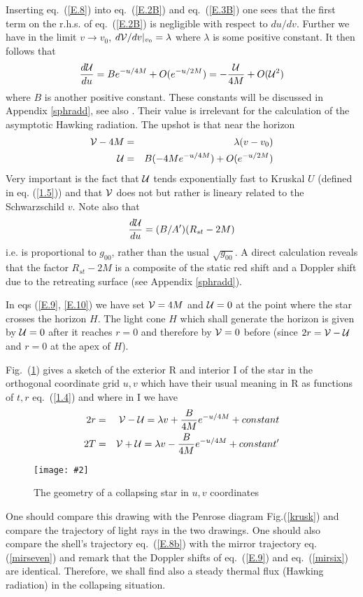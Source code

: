\documentclass[12pt,oneside]{report}
\newcommand{\dessin}[4]
{\begin{figure}[tp]\begin{center}
\texttt{[image: \#2]}%
\end{center}
\caption{#4}
\label{#3}
\end{figure}}
\begin{document}
Inserting eq.~(\ref {E.8}) into eq.~(\ref {E.2B}) and eq.~(\ref {E.3B}) one sees
that the first term on the r.h.s. of eq.~(\ref {E.2B}) is 
negligible with respect to $du/dv$. 
Further we have in the limit $v\to v_0$, $d {\cal{V}}  / dv  \vert_{v_0} =
\lambda$ where $\lambda$ is some positive constant. It then follows
that 
\begin{equation}
{d {\cal{U}}  \over du} = B e^{-u / 4M} + O (e^{-u /2M})
= - {{\cal{U}} \over 4M} + O ( {\cal{U}}^2 )  
\label{E.9}
\end{equation}
where $B$ is another positive constant. These constants will
be discussed in Appendix \ref{sphradd}, see also \cite{EMP}.
 Their value is irrelevant for the
calculation of the asymptotic Hawking radiation. The upshot is that
near the horizon
\begin{eqnarray}
 {\cal{V}} - 4M &=& \lambda (v - v_0)\nonumber\\
 {\cal{U}}  &=& B({-4M} e^{-u/4M})  + O (e^{-u /2M})
\label{E.10}
\end{eqnarray} 
Very important is the fact that ${\cal{U}}$ tends exponentially fast to
Kruskal $U$ 
(defined in eq.
(\ref{1.5}))
and
that ${\cal{V}}$ does not but rather is lineary related 
to the Schwarzschild $v$.
Note also that 
\begin{equation}  { d {\cal{U}}  \over du } = (B/A') (R_{st} -2M)
\label{g00}
\end{equation}
i.e. is proportional to  $g_{00}$, rather
than the usual $\sqrt{g_{00}}$. 
A direct calculation reveals that the factor $
R_{st} -2M$ is a composite
of the static red shift and a Doppler shift due to the retreating surface (see Appendix
\ref{sphradd}). 

In eqs (\ref{E.9}, \ref{E.10}) we have set $ {\cal{V}}  = 4M $ 
and $ {\cal{U}} =0$ at the point where the
star crosses the horizon $H$. The light cone $H$ which shall
generate the horizon is
 given by $ {\cal{U}} =0$ after it reaches $r=0$ and therefore 
by $ {\cal{V}} =0$ before (since $2 r= {\cal{V}}  -
 {\cal{U}} $ and $r=0$ at the apex of $H$).

Fig.~(\ref{star}) gives a sketch of the exterior R and interior I of the
star in the orthogonal coordinate grid $u,v$ which have their usual
meaning in R as functions of $t,r$ eq.~(\ref {1.4}) and where in I we have
\begin{eqnarray}
2r &=&  {\cal{V}} - {\cal{U}}  = \lambda v + {B \over 4M} e^{-u/4M} +
constant \nonumber\\
2T &=&  {\cal{V}} + {\cal{U}}  = \lambda v - {B \over 4M} e^{-u/4M} +
constant^\prime
\label{fig4}
\end{eqnarray}
\dessin{1.000}{NFIG3-4.eps}{star}{The geometry of a collapsing star in $u,v$ coordinates} 
One
should compare this drawing with the Penrose diagram Fig.(\ref{krusk}) and
compare the trajectory of light rays in the two drawings. One should also
compare the shell's trajectory eq.~(\ref{E.8b}) with the mirror trajectory eq.
(\ref{mirseven}) and remark that the Doppler shifts of eq.~(\ref{E.9}) and
eq.~(\ref{mirsix}) are identical.
Therefore, we shall find also 
a steady thermal flux (Hawking radiation) 
in the collapsing situation.
\end{document}
